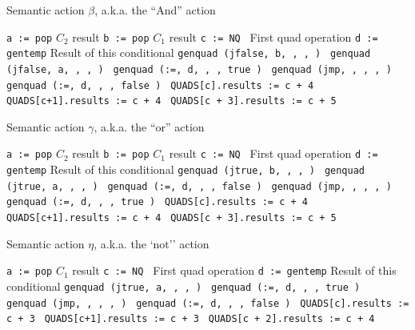 \documentclass[11pt]{article}
\begin{document}
\begin {algorithm}
\caption{ Semantic action $\beta$, a.k.a. the ``And''  action }
\label{alg:andaction}
\begin{algorithmic}
\STATE \texttt {a := pop}  $C_2$ result
\STATE \texttt {b := pop}  $C_1$ result
\STATE \texttt {c := NQ }  First quad operation
\STATE \texttt {d := gentemp}  Result of this conditional
\STATE \texttt {genquad (jfalse, b, , , ) }  
\STATE \texttt {genquad (jfalse, a, , , ) }  
\STATE \texttt {genquad (:=, d, , , true ) }  
\STATE \texttt {genquad (jmp, , , , ) }  
\STATE \texttt {genquad (:=, d, , , false ) }  
\STATE \texttt {QUADS[c].results := c + 4 }  
\STATE \texttt {QUADS[c+1].results := c + 4 }  
\STATE \texttt {QUADS[c + 3].results := c + 5 }  
\end{algorithmic}
\end{algorithm}


\begin {algorithm}
\caption{ Semantic action $\gamma$, a.k.a. the ``or''  action }
\label{alg:andaction}
\begin{algorithmic}
\STATE \texttt {a := pop}  $C_2$ result
\STATE \texttt {b := pop}  $C_1$ result
\STATE \texttt {c := NQ }  First quad operation
\STATE \texttt {d := gentemp}  Result of this conditional
\STATE \texttt {genquad (jtrue, b, , , ) }  
\STATE \texttt {genquad (jtrue, a, , , ) }  
\STATE \texttt {genquad (:=, d, , , false ) }  
\STATE \texttt {genquad (jmp, , , , ) }  
\STATE \texttt {genquad (:=, d, , , true ) }  
\STATE \texttt {QUADS[c].results := c + 4 }  
\STATE \texttt {QUADS[c+1].results := c + 4 }  
\STATE \texttt {QUADS[c + 3].results := c + 5 }  
\end{algorithmic}
\end{algorithm}


\begin {algorithm}
\caption{ Semantic action $\eta$, a.k.a. the `not''  action }
\label{alg:andaction}
\begin{algorithmic}
\STATE \texttt {a := pop}  $C_1$ result
\STATE \texttt {c := NQ }  First quad operation
\STATE \texttt {d := gentemp}  Result of this conditional
\STATE \texttt {genquad (jtrue, a, , , ) }  
\STATE \texttt {genquad (:=, d, , , true ) }  
\STATE \texttt {genquad (jmp, , , , ) }  
\STATE \texttt {genquad (:=, d, , , false ) }  
\STATE \texttt {QUADS[c].results := c + 3 }  
\STATE \texttt {QUADS[c+1].results := c + 3 }  
\STATE \texttt {QUADS[c + 2].results := c + 4 }  
\end{algorithmic}
\end{algorithm}
\end{document}
